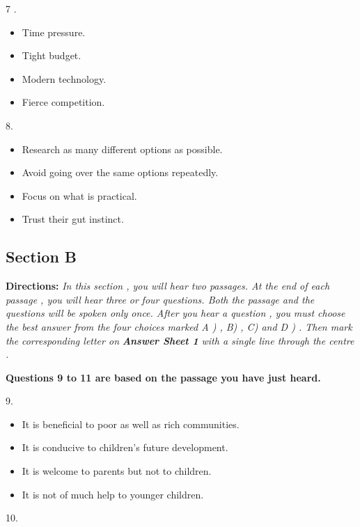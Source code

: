 \documentclass[UTF8,11pt]{ctexart}
\begin{document}
7 .


\begin{itemize}[leftmargin=2em,itemsep=.2em,topsep=.4em]\item[A.] Time pressure.
\item[B.] Tight budget.
\item[C.] Modern technology.
\item[D.] Fierce competition.
\end{itemize}

8.


\begin{itemize}[leftmargin=2em,itemsep=.2em,topsep=.4em]\item[A.] Research as many different options as possible.
\item[B.] Avoid going over the same options repeatedly.
\item[C.] Focus on what is practical.
\item[D.] Trust their gut instinct.
\end{itemize}

\subsection*{\textbf{Section B}}


\textbf{Directions: }\textit{In this section , you will hear two passages. At the end of each passage , you will hear three or} \textit{four questions. Both the passage and the questions will be spoken only once. After you hear a question , you} \textit{must choose the best answer from the four choices marked A ) , B) , C) and D ) . Then mark the} \textit{corresponding letter on }\textbf{\textit{Answer Sheet 1 }}\textit{with a single line through the centre .}


\textbf{Questions 9 to 11 are based on the passage you have just heard.}


9.


\begin{itemize}[leftmargin=2em,itemsep=.2em,topsep=.4em]\item[A.] It is beneficial to poor as well as rich communities.
\item[B.] It is conducive to children's future development.
\item[C.] It is welcome to parents but not to children.
\item[D.] It is not of much help to younger children.
\end{itemize}

10.
\end{document}
